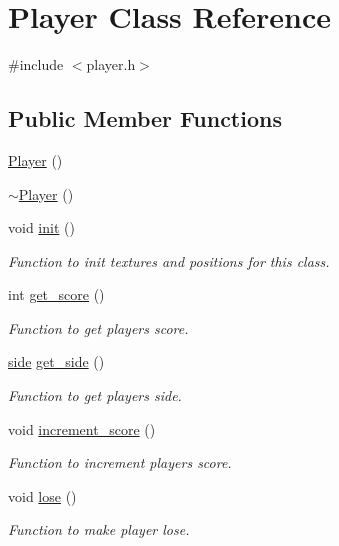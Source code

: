 \hypertarget{class_player}{}\section{Player Class Reference}
\label{class_player}


{\ttfamily \#include $<$player.\+h$>$}

\subsection*{Public Member Functions}
\begin{DoxyCompactItemize}
\item 
\hyperlink{class_player_affe0cc3cb714f6deb4e62f0c0d3f1fd8}{Player} ()
\item 
\hyperlink{class_player_a749d2c00e1fe0f5c2746f7505a58c062}{$\sim$\+Player} ()
\item 
void \hyperlink{class_player_a015ea21fa1e7273e47d48cb20d9b12e3}{init} ()
\begin{DoxyCompactList}\small\item\em Function to init textures and positions for this class. \end{DoxyCompactList}\item 
int \hyperlink{class_player_ad65c379a083e7c6656721616f8784059}{get\+\_\+score} ()
\begin{DoxyCompactList}\small\item\em Function to get player\textquotesingle{}s score. \end{DoxyCompactList}\item 
\hyperlink{assets_8h_afc015eff6557e84151d2e53b94375445}{side} \hyperlink{class_player_a6a10c68a1185ab336054868306fa3a73}{get\+\_\+side} ()
\begin{DoxyCompactList}\small\item\em Function to get player\textquotesingle{}s side. \end{DoxyCompactList}\item 
void \hyperlink{class_player_ab58df1547917c39756f063b0d57a1793}{increment\+\_\+score} ()
\begin{DoxyCompactList}\small\item\em Function to increment player\textquotesingle{}s score. \end{DoxyCompactList}\item 
void \hyperlink{class_player_af1ae3d8d7e22c5502d0380c16c7329ef}{lose} ()
\begin{DoxyCompactList}\small\item\em Function to make player lose. \end{DoxyCompactList}\item 

\end{DoxyCompactItemize}
